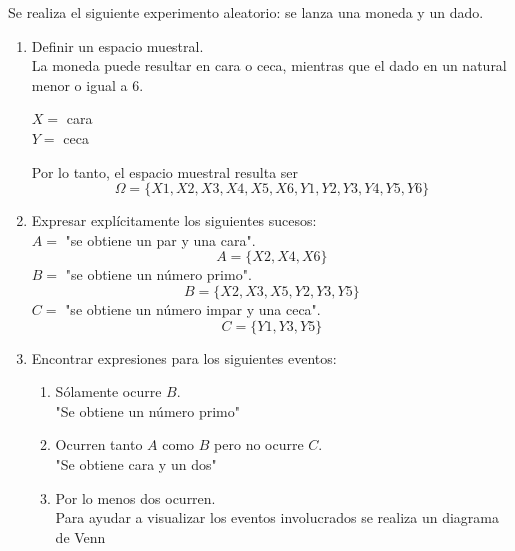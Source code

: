 \item Se realiza el siguiente experimento aleatorio: se lanza una moneda y un dado.
    \begin{enumerate}
        \item Definir un espacio muestral.\e\\
            La moneda puede resultar en cara o ceca, mientras que el dado en un natural menor o igual a 6.
            \begin{center}
                $X=$ cara\\
                $Y=$ ceca\\
            \end{center}
            Por lo tanto, el espacio muestral resulta ser\[\Omega=\{X1,X2,X3,X4,X5,X6,Y1,Y2,Y3,Y4,Y5,Y6\}\]
        \item Expresar explícitamente los siguientes sucesos:\\
            $A=$ "se obtiene un par y una cara".
            \[A=\{X2,X4,X6\}\]
            $B=$ "se obtiene un número primo".
            \[B=\{X2,X3,X5,Y2,Y3,Y5\}\]
            $C=$ "se obtiene un número impar y una ceca".
            \[C=\{Y1,Y3,Y5\}\]
        \item Encontrar expresiones para los siguientes eventos:
            \begin{enumerate}
                \item Sólamente ocurre $B$.\e\\
                    "Se obtiene un número primo"\e
                \item Ocurren tanto $A$ como $B$ pero no ocurre $C$.\e\\
                    "Se obtiene cara y un dos"\e
                \item Por lo menos dos ocurren.\e\\
                    Para ayudar a visualizar los eventos involucrados se realiza un diagrama de Venn
                    \begin{center}
\end{center}
\end{enumerate}
\end{enumerate}
